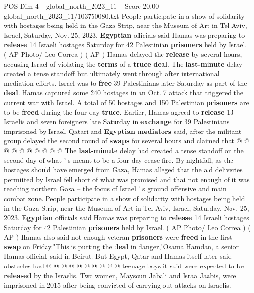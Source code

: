 \begin{textsample}{POS Dim 4 – global\_north\_2023\_11 – Score 20.00 – global\_north\_2023\_11/103750080.txt}  \label{ex:f4_pos_274}
People participate in a show of solidarity with hostages being held in the Gaza Strip, near the Museum of Art in Tel Aviv, Israel, Saturday, Nov. 25, 2023. \textbf{Egyptian} officials said Hamas was preparing to \textbf{release} 14 Israeli hostages Saturday for 42 Palestinian \textbf{prisoners} held by Israel. ( AP Photo/ Leo Correa ) ( AP ) Hamas delayed the \textbf{release} by several hours, accusing Israel of violating the \textbf{terms} of a \textbf{truce} \textbf{deal}.
The \textbf{last-minute} delay created a tense standoff but ultimately went through after international mediation efforts.
Israel was to \textbf{free} 39 Palestinians later Saturday as part of the \textbf{deal}.
Hamas captured some 240 hostages in an Oct. 7 attack that triggered the current war with Israel.
A total of 50 hostages and 150 Palestinian \textbf{prisoners} are to be \textbf{freed} during the four-day \textbf{truce}.
Earlier, Hamas agreed to \textbf{release} 13 Israelis and seven foreigners late Saturday in \textbf{exchange} for 39 Palestinians imprisoned by Israel, Qatari and \textbf{Egyptian} \textbf{mediators} said, after the militant group delayed the second round of \textbf{swaps} for several hours and claimed that @ @ @ @ @ @ @ @ @ @ The \textbf{last-minute} delay had created a tense standoff on the second day of what ' s meant to be a four-day cease-fire.
By nightfall, as the hostages should have emerged from Gaza, Hamas alleged that the aid deliveries permitted by Israel fell short of what was promised and that not enough of it was reaching northern Gaza -- the focus of Israel ' s ground offensive and main combat zone.
People participate in a show of solidarity with hostages being held in the Gaza Strip, near the Museum of Art in Tel Aviv, Israel, Saturday, Nov. 25, 2023. \textbf{Egyptian} officials said Hamas was preparing to \textbf{release} 14 Israeli hostages Saturday for 42 Palestinian \textbf{prisoners} held by Israel. ( AP Photo/ Leo Correa ) ( AP ) Hamas also said not enough veteran \textbf{prisoners} were \textbf{freed} in the first \textbf{swap} on Friday."This is putting the \textbf{deal} in danger,"Osama Hamdan, a senior Hamas official, said in Beirut.
But Egypt, Qatar and Hamas itself later said obstacles had @ @ @ @ @ @ @ @ @ @ teenage boys it said were expected to be \textbf{released} by the Israelis.
Two women, Maysoun Jabali and Israa Jaabis, were imprisoned in 2015 after being convicted of carrying out attacks on Israelis.

\end{textsample}
